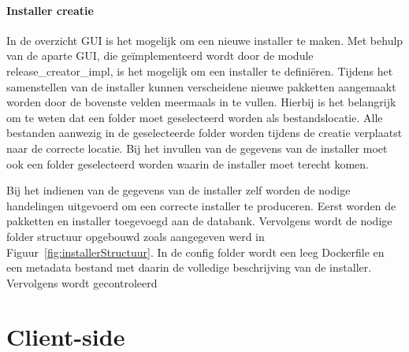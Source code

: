 \paragraph{Installer creatie}
In de overzicht GUI is het mogelijk om een nieuwe installer te maken.
Met behulp van de aparte GUI, die geïmplementeerd wordt door de module release\_creator\_impl, is het mogelijk om een installer te definiëren.
Tijdens het samenstellen van de installer kunnen verscheidene nieuwe pakketten aangemaakt worden door de bovenste velden meermaals in te vullen.
Hierbij is het belangrijk om te weten dat een folder moet geselecteerd worden als bestandslocatie.
Alle bestanden aanwezig in de geselecteerde folder worden tijdens de creatie verplaatst naar de correcte locatie.
Bij het invullen van de gegevens van de installer moet ook een folder geselecteerd worden waarin de installer moet terecht komen.

Bij het indienen van de gegevens van de installer zelf worden de nodige handelingen uitgevoerd om een correcte installer te produceren.
Eerst worden de pakketten en installer toegevoegd aan de databank.
Vervolgens wordt de nodige folder structuur opgebouwd zoals aangegeven werd in Figuur~\vref{fig:installerStructuur}.
In de config folder wordt een leeg Dockerfile en een metadata bestand met daarin de volledige beschrijving van de installer.
Vervolgens wordt gecontroleerd 

\section{Client-side}